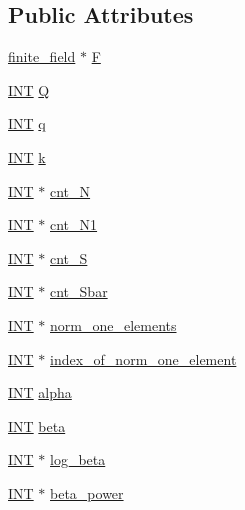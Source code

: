 \subsection*{Public Attributes}
\begin{DoxyCompactItemize}
\item 
\mbox{\hyperlink{classfinite__field}{finite\+\_\+field}} $\ast$ \mbox{\hyperlink{classhermitian_a8ebdbf6ff653e1aa9e6d87db6bbaa3e5}{F}}
\item 
\mbox{\hyperlink{galois_8h_a09fddde158a3a20bd2dcadb609de11dc}{I\+NT}} \mbox{\hyperlink{classhermitian_ae2341a7f756f0e2fce3747c6ef4ae656}{Q}}
\item 
\mbox{\hyperlink{galois_8h_a09fddde158a3a20bd2dcadb609de11dc}{I\+NT}} \mbox{\hyperlink{classhermitian_a23b35d788da02fe4d49b4bae2d193760}{q}}
\item 
\mbox{\hyperlink{galois_8h_a09fddde158a3a20bd2dcadb609de11dc}{I\+NT}} \mbox{\hyperlink{classhermitian_a8b0e35be8db5206cf8b1e4d55231d0b5}{k}}
\item 
\mbox{\hyperlink{galois_8h_a09fddde158a3a20bd2dcadb609de11dc}{I\+NT}} $\ast$ \mbox{\hyperlink{classhermitian_a380f043f959c9a00d8ad50292aff141e}{cnt\+\_\+N}}
\item 
\mbox{\hyperlink{galois_8h_a09fddde158a3a20bd2dcadb609de11dc}{I\+NT}} $\ast$ \mbox{\hyperlink{classhermitian_a0529fca35383b7610db946b084ebd360}{cnt\+\_\+\+N1}}
\item 
\mbox{\hyperlink{galois_8h_a09fddde158a3a20bd2dcadb609de11dc}{I\+NT}} $\ast$ \mbox{\hyperlink{classhermitian_a9b4cf8ee3a552d1fd02d6f10d103c98c}{cnt\+\_\+S}}
\item 
\mbox{\hyperlink{galois_8h_a09fddde158a3a20bd2dcadb609de11dc}{I\+NT}} $\ast$ \mbox{\hyperlink{classhermitian_a50141df0fde28e7ea09df0227bda8e72}{cnt\+\_\+\+Sbar}}
\item 
\mbox{\hyperlink{galois_8h_a09fddde158a3a20bd2dcadb609de11dc}{I\+NT}} $\ast$ \mbox{\hyperlink{classhermitian_a5d7acaf822dc7919704602943f4bfd39}{norm\+\_\+one\+\_\+elements}}
\item 
\mbox{\hyperlink{galois_8h_a09fddde158a3a20bd2dcadb609de11dc}{I\+NT}} $\ast$ \mbox{\hyperlink{classhermitian_ab9babc7f2f85d5d8da0397fa15109868}{index\+\_\+of\+\_\+norm\+\_\+one\+\_\+element}}
\item 
\mbox{\hyperlink{galois_8h_a09fddde158a3a20bd2dcadb609de11dc}{I\+NT}} \mbox{\hyperlink{classhermitian_a45b8edf4b4ba929820cd08ec0cfb213e}{alpha}}
\item 
\mbox{\hyperlink{galois_8h_a09fddde158a3a20bd2dcadb609de11dc}{I\+NT}} \mbox{\hyperlink{classhermitian_a0d85395ac6f6ed31e60e020800b2e4c1}{beta}}
\item 
\mbox{\hyperlink{galois_8h_a09fddde158a3a20bd2dcadb609de11dc}{I\+NT}} $\ast$ \mbox{\hyperlink{classhermitian_a3bc138034a7c78082f7c03301ffcdc79}{log\+\_\+beta}}
\item 
\mbox{\hyperlink{galois_8h_a09fddde158a3a20bd2dcadb609de11dc}{I\+NT}} $\ast$ \mbox{\hyperlink{classhermitian_ae753d004e8eb38698ea3207ec3391c27}{beta\+\_\+power}}
\end{DoxyCompactItemize}

